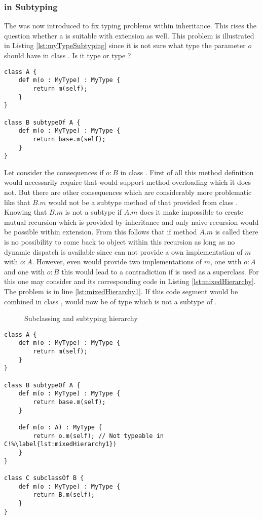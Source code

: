 \subsubsection{\mytype in Subtyping}
\label{ssec:mytypeInSubtype}
The \mytype was now introduced to fix typing problems within
inheritance. This rises the question whether a \mytype is suitable
with extension as well. This problem is illustrated in Listing
\ref{lst:myTypeSubtyping} since it is not sure what type the parameter
$o$ should have in class \B. Is it type \B or type \A? 

\begin{lstlisting}[float,language=ooplss,caption=\mytype within subtyping contexts,label=lst:myTypeSubtyping]
class A {
	def m(o : MyType) : MyType {
		return m(self);
	}
}

class B subtypeOf A {
	def m(o : MyType) : MyType {
		return base.m(self);
	}
}
\end{lstlisting}

Let consider the consequences if $o : B$ in class \B. First of all this
method definition would necessarily require that \ooplss would support
method overloading which it does not. But there are other consequences which
are considerably more problematic like that $B.m$ would not be a subtype method of that
provided from class \A. Knowing that $B.m$ is not a subtype if $A.m$ does
it make impossible to create mutual recursion which is provided by inheritance
and only naive recursion would be possible within extension. From this follows
that if method $A.m$ is called there is no possibility to come back to object \B 
within this recursion as long as no dynamic dispatch is available since \B can 
not provide a own implementation of $m$ with $o : A$. However, even \B would
provide two implementations of $m$, one with $o : A$ and one with $o : B$ this
would lead to a contradiction if \B is used as a superclass. For this one may
consider  and its corresponding code in Listing
\ref{lst:mixedHierarchy}. The problem is in line \ref{lst:mixedHierarchy1}. 
If this code segment would be combined in class \C, \self would now be of type
\C which is not a subtype of \A.

\begin{figure}[ht]
	\centering
	\caption{Subclassing and subtyping hierarchy}
	\label{fig:hierarchy}
\end{figure}

\begin{lstlisting}[float,language=ooplss,caption=Mixed extension and inheritance hierarchy,label=lst:mixedHierarchy]
class A {
	def m(o : MyType) : MyType {
		return m(self);
	}
}

class B subtypeOf A {
	def m(o : MyType) : MyType {
		return base.m(self);
	}

	def m(o : A) : MyType { 
		return o.m(self); // Not typeable in C!%\label{lst:mixedHierarchy1})
	}
}

class C subclassOf B {
	def m(o : MyType) : MyType {
		return B.m(self);
	}
}
\end{lstlisting}

